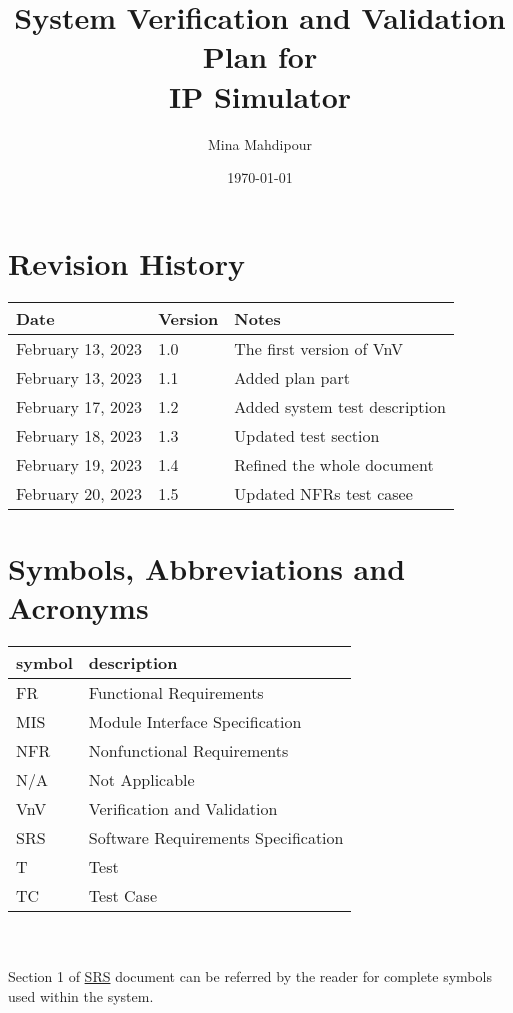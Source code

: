 \documentclass[12pt, titlepage]{article}
\begin{document}
\title{System Verification and Validation Plan for \\IP Simulator}
\author{Mina Mahdipour}
\date{\today}
	
\maketitle


\section{Revision History}

\begin{tabularx}{\textwidth}{p{4cm}p{2cm}X}
\toprule {\bf Date} & {\bf Version} & {\bf Notes}\\
\midrule
February 13, 2023 & 1.0 & The first version of VnV\\
February 13, 2023 & 1.1 & Added plan part\\
February 17, 2023 & 1.2 & Added system test description\\
February 18, 2023 & 1.3 & Updated test section\\
February 19, 2023 & 1.4 & Refined the whole document\\
February 20, 2023 & 1.5 & Updated NFRs test casee\\
\bottomrule
\end{tabularx}

\newpage

\tableofcontents

\listoftables


\newpage

\section{Symbols, Abbreviations and Acronyms}

\renewcommand{\arraystretch}{1.2}
\begin{tabular}{l l} 
  \toprule		
  \textbf{symbol} & \textbf{description}\\
  \midrule 
 
  FR & Functional Requirements\\
  MIS & Module Interface Specification\\
  NFR & Nonfunctional Requirements\\
  N/A & Not Applicable\\
  VnV & Verification and Validation\\
SRS & Software Requirements Specification\\
 T & Test\\
 TC& Test Case\\
\bottomrule
\end{tabular}\\
\\
Section 1 of \href{https://github.com/MinMah23/CAS741-Project/tree/main/docs/SRS/SRS.pdf}{SRS} document can be referred by the reader for complete symbols used within the system.
\newpage
\end{document}
